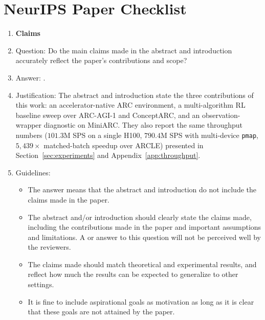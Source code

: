 \section*{NeurIPS Paper Checklist}

\begin{enumerate}

\item {\bf Claims}
    \item[] Question: Do the main claims made in the abstract and introduction accurately reflect the paper's contributions and scope?
    \item[] Answer: \answerYes{}.
    \item[] Justification: The abstract and introduction state the three contributions of this work: an accelerator-native ARC environment, a multi-algorithm RL baseline sweep over ARC-AGI-1 and ConceptARC, and an observation-wrapper diagnostic on MiniARC. They also report the same throughput numbers ($101.3$M SPS on a single H100, $790.4$M SPS with multi-device \texttt{pmap}, $5{,}439\times$ matched-batch speedup over ARCLE) presented in Section~\ref{sec:experiments} and Appendix~\ref{app:throughput}. 
    \item[] Guidelines:
    \begin{itemize}
        \item The answer \answerNA{} means that the abstract and introduction do not include the claims made in the paper.
        \item The abstract and/or introduction should clearly state the claims made, including the contributions made in the paper and important assumptions and limitations. A \answerNo{} or \answerNA{} answer to this question will not be perceived well by the reviewers. 
        \item The claims made should match theoretical and experimental results, and reflect how much the results can be expected to generalize to other settings. 
        \item It is fine to include aspirational goals as motivation as long as it is clear that these goals are not attained by the paper. 
    \end{itemize}


\end{enumerate}
